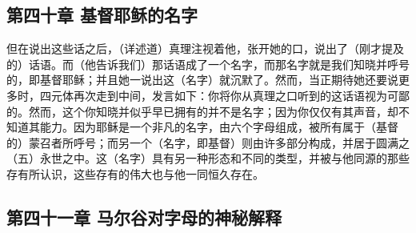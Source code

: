 
\subsection{第四十章 基督耶稣的名字}

但在说出这些话之后，（详述道）真理注视着他，张开她的口，说出了（刚才提及的）话语。而（他告诉我们）那话语成了一个名字，而那名字就是我们知晓并呼号的，即基督耶稣；并且她一说出这（名字）就沉默了。然而，当正期待她还要说更多时，四元体再次走到中间，发言如下：你将你从真理之口听到的这话语视为可鄙的。然而，这个你知晓并似乎早已拥有的并不是名字；因为你仅仅有其声音，却不知道其能力。因为耶稣是一个非凡的名字，由六个字母组成，被所有属于（基督的）蒙召者所呼号；而另一个（名字，即基督）则由许多部分构成，并居于圆满之（五）永世之中。这（名字）具有另一种形态和不同的类型，并被与他同源的那些存有所认识，这些存有的伟大也与他一同恒久存在。\par


\subsection{第四十一章 马尔谷对字母的神秘解释}

